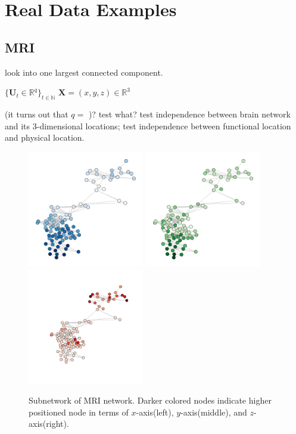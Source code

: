 \documentclass[12pt]{article}
\theoremstyle{definition}
\begin{document}
\section{Real Data Examples}
\label{sec:real}
	
\subsection{MRI}
	
look into one largest connected component. 
	
$\{ \mathbf{U}_{t} \in \mathbb{R}^{q} \}_{t \in \mathbb{N}}$ $\mathbf{X} = (x,y,z) \in \mathbb{R}^{3}$
	
	(it turns out that $q=$ )?
test what? test independence between brain network and its 3-dimensional locations; test independence between functional location and physical location. 
	
\begin{figure}[H]
		\centering
		\label{fig:mri}
		\includegraphics[width=2in]{../Figure/brain1_x.pdf}
		\includegraphics[width=2in]{../Figure/brain1_y.pdf}
		\includegraphics[width=2in]{../Figure/brain1_z.pdf}
		\caption{Subnetwork of MRI network. Darker colored nodes indicate higher positioned node in terms of $x$-axis(left), $y$-axis(middle), and $z$-axis(right).}
\end{figure}
	
\end{document}

